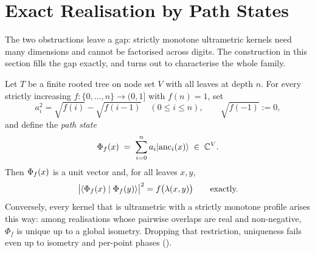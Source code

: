 \section{Exact Realisation by Path States}
\label{sec:theorem-c}

The two obstructions leave a gap: strictly monotone ultrametric kernels need many
dimensions and cannot be factorised across digits. The construction in this section
fills the gap exactly, and turns out to characterise the whole family.

\begin{theorem}
  \label{thm:path-states}
  Let $T$ be a finite rooted tree on node set $V$ with all leaves at depth $n$. For
  every strictly increasing $f : \{0, \dots, n\} \to (0, 1]$ with $f(n) = 1$, set
  \begin{equation}
    \label{eq:amplitudes}
    a_i^{2} = \sqrt{f(i)} - \sqrt{f(i-1)} \quad (0 \le i \le n), \qquad
    \sqrt{f(-1)} := 0,
  \end{equation}
  and define the \emph{path state}
  \begin{equation}
    \label{eq:path-state}
    \Phi_f(x) \;=\; \sum_{i=0}^{n} a_i \lvert \operatorname{anc}_i(x) \rangle \;\in\; \mathbb{C}^{V} .
  \end{equation}
  Then $\Phi_f(x)$ is a unit vector and, for all leaves $x, y$,
  \begin{equation}
    \label{eq:exactness}
    \bigl\lvert\langle \Phi_f(x) \mid \Phi_f(y) \rangle\bigr\rvert^{2} = f\bigl(\lambda(x,y)\bigr) \qquad
    \text{exactly.}
  \end{equation}
  Conversely, every kernel that is ultrametric with a strictly monotone profile arises
  this way: among realisations whose pairwise overlaps are real and non-negative,
  $\Phi_f$ is unique up to a global isometry. Dropping that restriction, uniqueness
  fails even up to isometry and per-point phases ().
\end{theorem}

